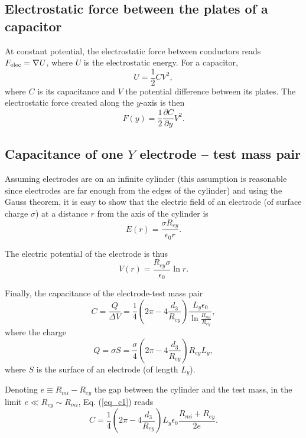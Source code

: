 \documentclass[12pt]{iopart}
\begin{document}
\subsection{Electrostatic force between the plates of a capacitor}

At constant potential, the electrostatic force between conductors reads $F_{\rm elec} = \nabla U$, where $U$ is the electrostatic energy. For a capacitor,
\begin{equation}
U = \frac{1}{2} CV^2,
\end{equation} 
where $C$ is its capacitance and $V$ the potential difference between its plates. The electrostatic force created along the $y$-axis is then
\begin{equation} \label{eq_eforce}
F(y) = \frac{1}{2} \frac{\partial C}{\partial y} V^2.
\end{equation}


\subsection{Capacitance of one $Y$ electrode -- test mass pair}

Assuming electrodes are on an infinite cylinder (this assumption is reasonable since electrodes are far enough from the edges of the cylinder) and using the Gauss theorem, it is easy to show that the electric field of an electrode (of surface charge $\sigma$) at a distance $r$ from the axis of the cylinder is
\begin{equation}
E(r) = \frac{\sigma R_{ey}}{\epsilon_0 r}.
\end{equation}

The electric potential of the electrode is thus
\begin{equation}
V(r) = \frac{R_{ey} \sigma}{\epsilon_0} \ln r.
\end{equation}

Finally, the capacitance of the electrode-test mass pair 
\begin{equation} \label{eq_c1}
C = \frac{Q}{\Delta V} = \frac{1}{4} \left(2\pi - 4\frac{d_3}{R_{ey}}\right) \frac{L_y \epsilon_0}{\ln \frac{R_{mi}}{R_{ey}}},
\end{equation}
where the charge
\begin{equation} \label{eq_q}
Q = \sigma S = \frac{\sigma}{4} \left(2\pi - 4\frac{d_3}{R_{ey}}\right) R_{ey} L_y,
\end{equation}
where $S$ is the surface of an electrode (of length $L_y$).


Denoting $e \equiv R_{mi}-R_{ey}$ the gap between the cylinder and the test mass, in the limit $e \ll R_{ey} \sim R_{mi}$, Eq. (\ref{eq_c1}) reads
\begin{equation}
C = \frac{1}{4} \left(2\pi - 4 \frac{d_3}{R_{ey}}\right) L_y \epsilon_0 \frac{R_{mi} + R_{ey}}{2e}.
\end{equation}
\end{document}
